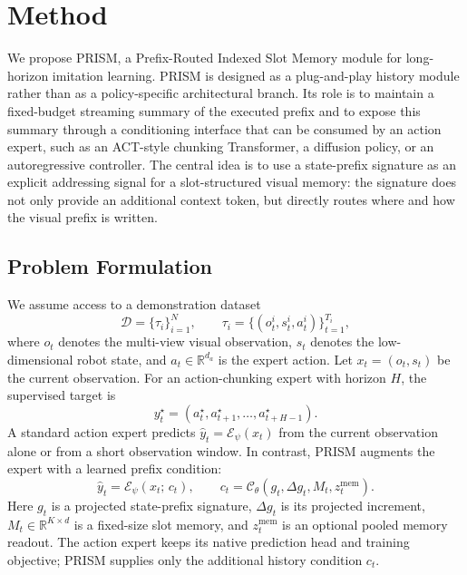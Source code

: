 
\section{Method}
\label{sec:method}

We propose PRISM, a Prefix-Routed Indexed Slot Memory module for long-horizon
imitation learning. PRISM is designed as a plug-and-play history module rather
than as a policy-specific architectural branch. Its role is to maintain a
fixed-budget streaming summary of the executed prefix and to expose this summary
through a conditioning interface that can be consumed by an action expert, such
as an ACT-style chunking Transformer, a diffusion policy, or an autoregressive
controller. The central idea is to use a state-prefix signature as an explicit
addressing signal for a slot-structured visual memory: the signature does not
only provide an additional context token, but directly routes where and how the
visual prefix is written.

\subsection{Problem Formulation}
\label{sec:method_problem}

We assume access to a demonstration dataset
\begin{equation}
    \mathcal{D} = \{\tau_i\}_{i=1}^{N}, \qquad
    \tau_i = \{(o_t^i, s_t^i, a_t^i)\}_{t=1}^{T_i},
\end{equation}
where $o_t$ denotes the multi-view visual observation, $s_t$ denotes the
low-dimensional robot state, and $a_t \in \mathbb{R}^{d_a}$ is the expert action. Let
$x_t=(o_t,s_t)$ be the current observation. For an action-chunking expert with
horizon $H$, the supervised target is
\begin{equation}
    y_t^\star = (a_t^\star, a_{t+1}^\star,\ldots,a_{t+H-1}^\star).
\end{equation}
A standard action expert predicts $\hat y_t=\mathcal{E}_{\psi}(x_t)$ from the current
observation alone or from a short observation window. In contrast, PRISM
augments the expert with a learned prefix condition:
\begin{equation}
    \hat y_t =
    \mathcal{E}_{\psi}\!\left(x_t;\, c_t\right),
    \qquad
    c_t = \mathcal{C}_{\theta}(g_t,\Delta g_t,M_t,z_t^{\mathrm{mem}}).
    \label{eq:prism_policy}
\end{equation}
Here $g_t$ is a projected state-prefix signature, $\Delta g_t$ is its projected
increment, $M_t \in \mathbb{R}^{K \times d}$ is a fixed-size slot memory, and
$z_t^{\mathrm{mem}}$ is an optional pooled memory readout. The action expert
keeps its native prediction head and training objective; PRISM supplies only
the additional history condition $c_t$.

